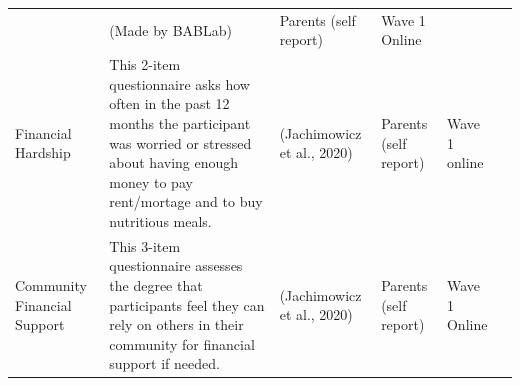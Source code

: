\documentclass[
]{book}
\begin{document}
\begin{longtable}[]{@{}llllll@{}}
\begin{minipage}[t]{0.18\columnwidth}
\end{minipage} & \begin{minipage}[t]{0.15\columnwidth}\raggedright
(Made by BABLab)\strut
\end{minipage} & \begin{minipage}[t]{0.16\columnwidth}\raggedright
Parents (self report)\strut
\end{minipage} & \begin{minipage}[t]{0.06\columnwidth}\raggedright
Wave 1 Online\strut
\end{minipage} & \begin{minipage}[t]{0.10\columnwidth}\raggedright
\strut
\end{minipage}\tabularnewline
\begin{minipage}[t]{0.18\columnwidth}\raggedright
Financial Hardship\strut
\end{minipage} & \begin{minipage}[t]{0.18\columnwidth}\raggedright
This 2-item questionnaire asks how often in the past 12 months the participant was worried or stressed about having enough money to pay rent/mortage and to buy nutritious meals.\strut
\end{minipage} & \begin{minipage}[t]{0.15\columnwidth}\raggedright
(Jachimowicz et al., 2020)\strut
\end{minipage} & \begin{minipage}[t]{0.16\columnwidth}\raggedright
Parents (self report)\strut
\end{minipage} & \begin{minipage}[t]{0.06\columnwidth}\raggedright
Wave 1 online\strut
\end{minipage} & \begin{minipage}[t]{0.10\columnwidth}\raggedright
\strut
\end{minipage}\tabularnewline
\begin{minipage}[t]{0.18\columnwidth}\raggedright
Community Financial Support\strut
\end{minipage} & \begin{minipage}[t]{0.18\columnwidth}\raggedright
This 3-item questionnaire assesses the degree that participants feel they can rely on others in their community for financial support if needed.\strut
\end{minipage} & \begin{minipage}[t]{0.15\columnwidth}\raggedright
(Jachimowicz et al., 2020)\strut
\end{minipage} & \begin{minipage}[t]{0.16\columnwidth}\raggedright
Parents (self report)\strut
\end{minipage} & \begin{minipage}[t]{0.06\columnwidth}\raggedright
Wave 1 Online\strut
\end{minipage} & \begin{minipage}[t]{0.10\columnwidth}\raggedright
\strut
\end{minipage}\tabularnewline
\bottomrule
\end{longtable}
\end{document}
